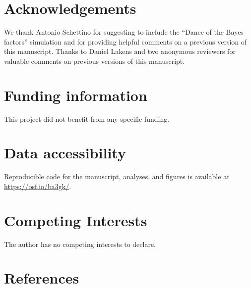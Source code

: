 \documentclass[
  english,
  man, donotrepeattitle,floatsintext]{apa6}
\begin{document}
\hypertarget{acknowledgements}{%
\section*{Acknowledgements}\label{acknowledgements}}

We thank Antonio Schettino for suggesting to include the ``Dance of the Bayes factors'' simulation and for providing helpful comments on a previous version of this manuscript. Thanks to Daniel Lakens and two anonymous reviewers for valuable comments on previous versions of this manuscript.

\hypertarget{funding-information}{%
\section{Funding information}\label{funding-information}}

This project did not benefit from any specific funding.

\hypertarget{supp}{%
\section{Data accessibility}\label{supp}}

Reproducible code for the manuscript, analyses, and figures is available at \url{https://osf.io/ba3gk/}.

\hypertarget{competing-interests}{%
\section{Competing Interests}\label{competing-interests}}

The author has no competing interests to declare.

\hypertarget{references}{%
\section*{References}\label{references}}
\end{document}
